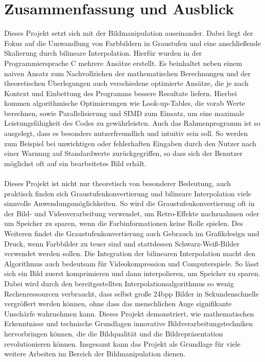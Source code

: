 \documentclass[course=erap]{aspdoc}
\begin{document}
\section{Zusammenfassung und Ausblick}
Dieses Projekt setzt sich mit der Bildmanipulation auseinander. Dabei liegt der Fokus auf die Umwandlung von Farbbildern in Graustufen und eine anschließende Skalierung durch bilineare Interpolation. Hierfür wurden in der Programmiersprache C mehrere Ansätze erstellt. Es beinhaltet neben einem naiven Ansatz zum Nachvollziehen der mathematischen Berechnungen und der theoretischen Überlegungen auch verschiedene optimierte Ansätze, die je nach Kontext und Einbettung des Programms bessere Resultate liefern. Hierbei kommen algorithmische Optimierungen wie Look-up-Tables, die vorab Werte berechnen, sowie Parallelisierung und SIMD zum Einsatz, um eine maximale Leistungsfähigkeit des Codes zu gewährleisten. Auch das Rahmenprogramm ist so ausgelegt, dass es besonders nutzerfreundlich und intuitiv sein soll. So werden zum Beispiel bei unwichtigen oder fehlerhaften Eingaben durch den Nutzer nach einer Warnung auf Standardwerte zurückgegriffen, so dass sich der Benutzer möglichst oft auf ein bearbeitetes Bild erhält.\\\\
Dieses Projekt ist nicht nur theoretisch von besonderer Bedeutung, auch praktisch finden sich Graustufenkonvertierung und bilineare Interpolation viele sinnvolle Anwendungsmöglichkeiten. So wird die Graustufenkonvertierung oft in der Bild- und Videoverarbeitung verwendet, um Retro-Effekte nachzuahmen oder um Speicher zu sparen, wenn die Farbinformationen keine Rolle spielen. Des Weiteren findet die Graustufenkonvertierung auch Gebrauch im Grafikdesign und Druck, wenn Farbbilder zu teuer sind und stattdessen Schwarz-Weiß-Bilder verwendet werden sollen. Die Integration der bilinearen Interpolation macht den Algorithmus auch bedeutsam für Videokompression und Computerspiele. So lässt sich ein Bild zuerst komprimieren und dann interpolieren, um Speicher zu sparen. Dabei wird durch den bereitgestellten Interpolationsalgorithmus so wenig Rechenressourcen verbraucht, dass selbst große 24bpp Bilder in Sekundenschnelle vergrößert werden können, ohne dass das menschlichen Auge signifikante Unschärfe wahrnehmen kann.
Dieses Projekt demonstriert, wie mathematischen Erkenntnisse und technische Grundlagen innovative Bildverarbeitungstechniken hervorbringen können, die die Bildqualität und die Bildrepräsentation revolutionieren können. Insgesamt kann das Projekt als Grundlage für viele weitere Arbeiten im Bereich der Bildmanipulation dienen.


{

\cite{ece472}
\cite{ppm}
\cite{ppmformats}
\cite{pgmpgmpbm}
\cite{grafikgraustufen}
\cite{bilint}
\cite{wahrnehmung}

}
\end{document}
